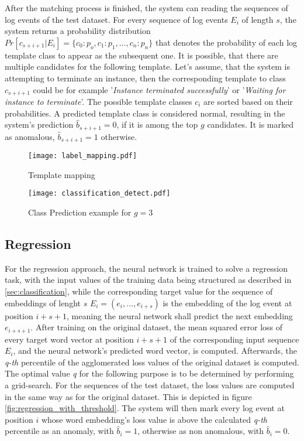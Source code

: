 After the matching process is finished, the system can reading the sequences of log events of the test dataset. For every sequence of log events $E_i$ of length $s$, the system returns a probability distribution $Pr[c_{s+i+1}|E_i] = \{c_0 : p_o, c_1 : p_1, ..., c_n : p_n\}$ that denotes the probability of each log template class to appear as the subsequent one. It is possible, that there are multiple candidates for the following template. Let's assume, that the system is attempting to terminate an instance, then the corresponding template to class $c_{s+i+1}$ could be for example '\textit{Instance terminated successfully}' or '\textit{Waiting for instance to terminate}'. The possible template classes $c_i$ are sorted based on their probabilities. A predicted template class is considered normal, resulting in the system's prediction $\hat{b}_{s+i+1}=0$, if it is among the top $g$ candidates. It is marked as anomalous, $\hat{b}_{s+i+1}=1$ otherwise.
 

\begin{figure}[H]
	\centering
	\captionsetup{justification=centering}
	\texttt{[image: label\_mapping.pdf]}
	\caption{Template mapping}
	\label{fig:label_mapping}
\end{figure}

\begin{figure}[H]
	\centering	
	\texttt{[image: classification\_detect.pdf]}
	\caption{Class Prediction example for $g=3$}
	\label{fig:class_prediction}
\end{figure}
\newpage
\subsection{Regression \label{sec:regression}}
For the regression approach, the neural network is trained to solve a regression task, with the input values of the training data being structured as described in \ref{sec:classification}, while the corresponding target value for the sequence of embeddings of lenght $s$ $E_i = (e_i, ..., e_{i+s})$ is the embedding of the log event at position $i+s+1$, meaning the neural network shall predict the next embedding $e_{i+s+1}$. After training on the original dataset, the mean squared error loss of every target word vector at position $i+s+1$ of the corresponding input sequence $E_i$, and the neural network's predicted word vector, is computed. Afterwards, the \textit{q-th} percentile of the agglomerated loss values of the original dataset is computed. The optimal value \textit{q} for the following purpose is to be determined by performing a grid-search. For the sequences of the test dataset, the loss values are computed in the same way as for the original dataset. This is depicted in figure \ref{fig:regression_with_threshold}. The system will then mark every log event at position $i$ whose word embedding's loss value is above the calculated \textit{q-th} percentile as an anomaly, with $\hat{b}_i=1$, otherwise as non anomalous, with $\hat{b}_i=0$.

